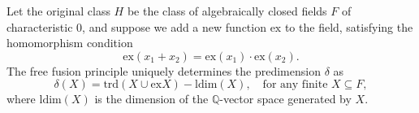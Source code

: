 Let the original class $H$ be the class of algebraically closed fields $F$ of characteristic $0$, and suppose we add a new function $\text{ex}$ to the field, satisfying the homomorphism condition
$$\text{ex}(x_1 + x_2) = \text{ex}(x_1) \cdot \text{ex}(x_2).$$
The free fusion principle uniquely determines the predimension $\delta$ as
$$\delta(X) = \text{trd}(X \cup \text{ex}X) - \text{ldim}(X), \quad \text{for any finite } X \subseteq F,$$
where $\text{ldim}(X)$ is the dimension of the $\mathbb{Q}$-vector space generated by $X$.
